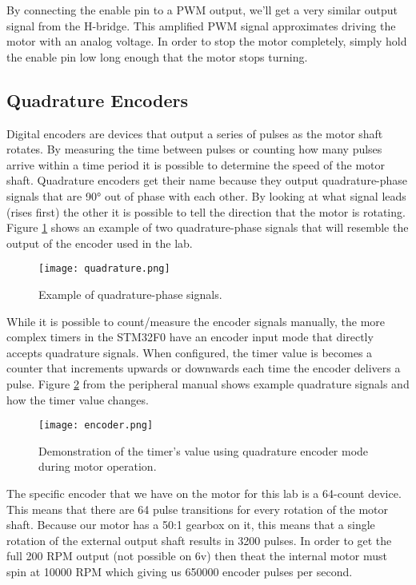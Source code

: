 \documentclass[openany,11pt,fleqn]{book} %
\begin{document}
\noindent By connecting the enable pin to a PWM output, we'll get a very similar output signal from the H-bridge. This amplified PWM signal approximates driving the motor with an analog voltage. In order to stop the motor completely, simply hold the enable pin low long enough that the motor stops turning. 

\subsection{\color{orange}Quadrature Encoders}

Digital encoders are devices that output a series of pulses as the motor shaft rotates. By measuring the time between pulses or counting how many pulses arrive within a time period it is possible to determine the speed of the motor shaft. Quadrature encoders get their name because they output quadrature-phase signals that are 90° out of phase with each other. By looking at what signal leads (rises first) the other it is possible to tell the direction that the motor is rotating. Figure \ref{quadrature} shows an example of two quadrature-phase signals that will resemble the output of the encoder used in the lab.

\begin{figure}[tb]
    \centering\texttt{[image: quadrature.png]}
    \caption{Example of quadrature-phase signals.}
    \label{quadrature}
\end{figure}

\noindent While it is possible to count/measure the encoder signals manually, the more complex timers in the STM32F0 have an encoder input mode that directly accepts quadrature signals. When configured, the timer value is becomes a counter that increments upwards or downwards each time the encoder delivers a pulse. Figure \ref{encoder} from the peripheral manual shows example quadrature signals and how the timer value changes.

\begin{figure}[tb]
    \centering\texttt{[image: encoder.png]}
    \caption{Demonstration of the timer's value using quadrature encoder mode during motor operation. }
    \label{encoder}
\end{figure}

The specific encoder that we have on the motor for this lab is a 64-count device. This means that there are 64 pulse transitions for every rotation of the motor shaft. Because our motor has a 50:1 gearbox on it, this means that a single rotation of the external output shaft results in 3200 pulses. In order to get the full 200 RPM output (not possible on 6v) then theat the internal motor must spin at 10000 RPM which giving us 650000 encoder pulses per second. 
\end{document}
